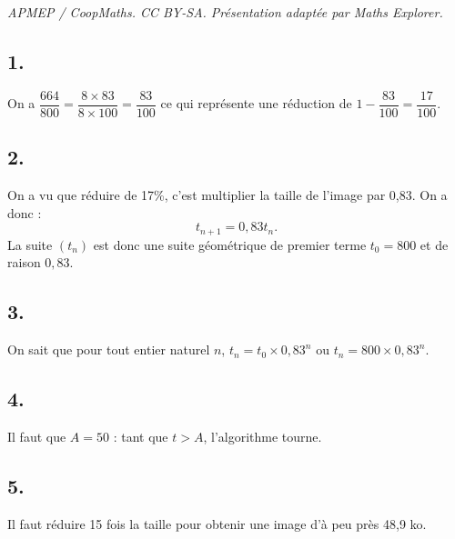 \documentclass[10pt]{article}
\begin{document}
\noindent\textit{APMEP / CoopMaths. CC BY-SA. Présentation adaptée par Maths Explorer.}\par\medskip
\subsection*{1.}

On a \(\dfrac{664}{800} = \dfrac{8 \times 83}{8 \times 100} = \dfrac{83}{100}\) ce qui représente une réduction de \(1 - \dfrac{83}{100} = \dfrac{17}{100}\).

\subsection*{2.}

On a vu que réduire de 17\%, c'est multiplier la taille de l'image par 0,83.  
On a donc :
\[
t_{n+1} = 0,83 t_n.
\]
La suite \((t_n)\) est donc une suite géométrique de premier terme \(t_0 = 800\) et de raison \(0,83\).

\subsection*{3.}

On sait que pour tout entier naturel \(n\), \(t_n = t_0 \times 0,83^n\) ou \(t_n = 800 \times 0,83^n\).

\subsection*{4.}

Il faut que \(A = 50\) : tant que \(t > A\), l'algorithme tourne.

\subsection*{5.}

Il faut réduire 15 fois la taille pour obtenir une image d'à peu près 48,9 ko.
\end{document}
